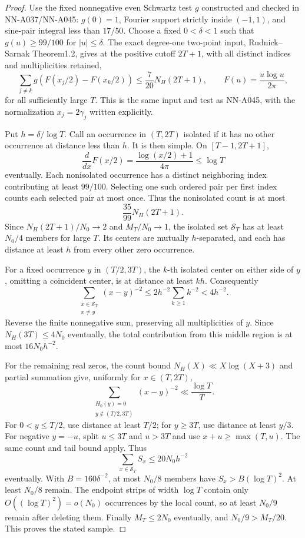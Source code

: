 \begin{proof}
Use the fixed nonnegative even Schwartz test \(g\) constructed
and checked in NN-A037/NN-A045: \(g(0)=1\), Fourier support
strictly inside \((-1,1)\), and sine-pair integral less
than \(17/50\). Choose a fixed \(0<\delta<1\) such that
\(g(u)\ge99/100\) for \(|u|\le\delta\).
The exact degree-one two-point input, Rudnick--Sarnak
Theorem1.2, gives at the positive cutoff \(2T+1\),
with all distinct indices and multiplicities retained,
\[
 \sum_{j\ne k}
 g\left(F(x_j/2)-F(x_k/2)\right)
                   \le\frac7{20}N_H(2T+1),
 \qquad F(u)=\frac{u\log u}{2\pi},
\]
for all sufficiently large \(T\).
This is the same input and test as NN-A045, with the
normalization \(x_j=2\gamma_j\) written explicitly.

Put \(h=\delta/\log T\). Call an occurrence in \((T,2T)\)
isolated if it has no other occurrence at distance less
than \(h\). It is then simple. On \([T-1,2T+1]\),
\[
                 \frac{d}{dx}F(x/2)
                  =\frac{\log(x/2)+1}{4\pi}\le\log T
\]
eventually. Each nonisolated occurrence has a distinct
neighboring index contributing at least \(99/100\).
Selecting one such ordered pair per first index counts
each selected pair at most once. Thus the nonisolated
count is at most
\[
                  \frac{35}{99}N_H(2T+1).
\]
Since \(N_H(2T+1)/N_0\to2\) and \(M_T/N_0\to1\),
the isolated set \(\mathcal S_T\) has at least \(N_0/4\)
members for large \(T\). Its centers are mutually
\(h\)-separated, and each has distance at least \(h\)
from every other zero occurrence.

For a fixed occurrence \(y\) in \((T/2,3T)\), the
\(k\)-th isolated center on either side of \(y\), omitting
a coincident center, is at distance at least \(kh\).
Consequently
\[
 \sum_{\substack{x\in\mathcal S_T\\x\ne y}}
          (x-y)^{-2}
       \le2h^{-2}\sum_{k\ge1}k^{-2}<4h^{-2}.
\]
Reverse the finite nonnegative sum, preserving all
multiplicities of \(y\). Since \(N_H(3T)\le4N_0\)
eventually, the total contribution from this middle
region is at most \(16N_0h^{-2}\).

For the remaining real zeros, the count bound
\(N_H(X)\ll X\log(X+3)\) and partial summation give,
uniformly for \(x\in(T,2T)\),
\[
 \sum_{\substack{H_0(y)=0\\y\notin(T/2,3T)}}(x-y)^{-2}
                                  \ll\frac{\log T}{T}.
\]
For \(0<y\le T/2\), use distance at least \(T/2\);
for \(y\ge3T\), use distance at least \(y/3\).
For negative \(y=-u\), split \(u\le3T\) and \(u>3T\)
and use \(x+u\ge\max(T,u)\). The same count and tail
bound apply. Thus
\[
                  \sum_{x\in\mathcal S_T}S_x
                         \le20N_0h^{-2}
\]
eventually. With \(B=160\delta^{-2}\), at most \(N_0/8\)
members have \(S_x>B(\log T)^2\). At least \(N_0/8\)
remain. The endpoint strips of width \(\log T\) contain
only \(O((\log T)^2)=o(N_0)\) occurrences by the local
count, so at least \(N_0/9\) remain after deleting them.
Finally \(M_T\le2N_0\) eventually, and
\(N_0/9>M_T/20\). This proves the stated sample.
\end{proof}

